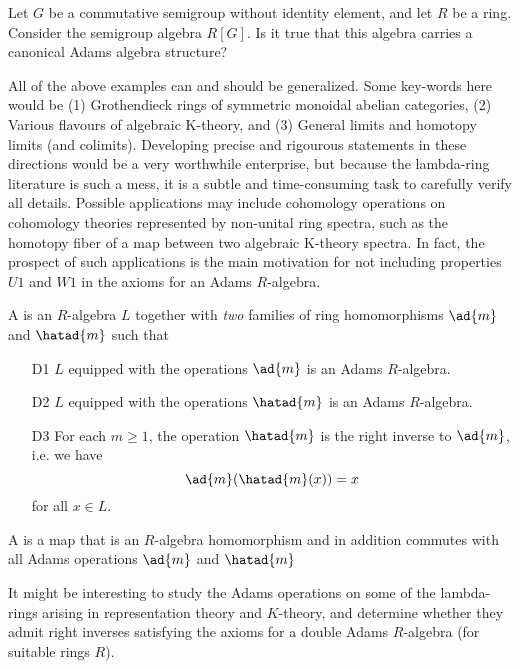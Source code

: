 \begin{exercise}
Let $G$ be a commutative semigroup without identity element, and let $R$ be a ring. Consider the semigroup algebra $R[G]$. Is it true that this algebra carries a canonical Adams algebra structure?
\end{exercise}

\begin{remark}
All of the above examples can and should be generalized. Some key-words here would be (1) Grothendieck rings of symmetric monoidal abelian categories, (2) Various flavours of algebraic K-theory, and (3) General limits and homotopy limits (and colimits). Developing precise and rigourous statements in these directions would be a very worthwhile enterprise, but because the lambda-ring literature is such a mess, it is a subtle and time-consuming task to carefully verify all details. Possible applications may include cohomology operations on cohomology theories represented by non-unital ring spectra, such as the homotopy fiber of a map between two algebraic K-theory spectra. In fact, the prospect of such applications is the main motivation for not including properties $U1$ and $W1$ in the axioms for an Adams $R$-algebra.
\end{remark}

\begin{definition}
A  is an $R$-algebra $L$ together with \emph{two} families of ring homomorphisms $\ad{m}$ and $\hatad{m}$ such that
\begin{itemize}
\item[D1] $L$ equipped with the operations $\ad{m}$ is an Adams $R$-algebra.
\item[D2] $L$ equipped with the operations $\hatad{m}$ is an Adams $R$-algebra.
\item[D3] For each $m \geq 1$, the operation $\hatad{m}$ is the right inverse to $\ad{m}$, i.e. we have 
$$     \ad{m} ( \hatad{m}  (x)) = x $$
for all $x \in L$.  
\end{itemize} 
\end{definition}

\begin{definition}
A  is a map that is an $R$-algebra homomorphism and in addition commutes with all Adams operations $\ad{m}$ and $\hatad{m}$
\end{definition}


It might be interesting to study the Adams operations on some of the lambda-rings arising in representation theory and $K$-theory, and determine whether they admit right inverses satisfying the axioms for a double Adams $R$-algebra (for suitable rings $R$). 

